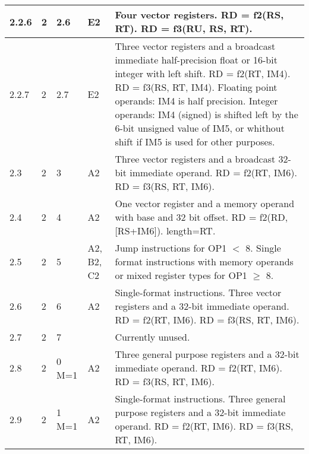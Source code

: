 \documentclass[forwardcom.tex]{subfiles}
\begin{document}
\begin{longtable} {|p{10mm}|p{6mm}|p{9mm}|p{7mm}|p{80mm}|}
\hline
2.2.6 & 2 & 2.6 & E2 & Four vector registers.\newline 
RD = f2(RS, RT). \newline 
RD = f3(RU, RS, RT).\\

\hline
2.2.7 & 2 & 2.7 & E2 & Three vector registers and a broadcast immediate half-precision float or 16-bit integer with left shift.\newline 
RD = f2(RT, IM4). \newline 
RD = f3(RS, RT, IM4).\newline
Floating point operands: IM4 is half precision.
Integer operands: IM4 (signed) is shifted left by the 6-bit unsigned value of IM5, or whithout shift if IM5 is used for other purposes. \\

\hline
2.3 & 2 & 3 & A2 & Three vector registers and a broadcast 32-bit immediate operand.\newline 
RD = f2(RT, IM6). \newline 
RD = f3(RS, RT, IM6).\\

\hline
2.4 & 2 & 4 & A2 & One vector register and a memory operand with base and 32 bit offset.\newline
RD = f2(RD, [RS+IM6]). length=RT.\\

\hline
2.5 & 2 & 5 & A2, B2, C2 & Jump instructions for OP1 $<$ 8. Single format instructions with memory operands or mixed register types for OP1 $\geq$ 8.\\

\hline
2.6 & 2 & 6 & A2 & Single-format instructions. Three vector registers and a 32-bit immediate operand.\newline 
RD = f2(RT, IM6). \newline 
RD = f3(RS, RT, IM6).\\

\hline
2.7 & 2 & 7 &  & Currently unused.\\

\hline
2.8 & 2 & 0 M=1 & A2 & Three general purpose registers and a 32-bit immediate operand.\newline 
RD = f2(RT, IM6). \newline 
RD = f3(RS, RT, IM6).\\

\hline
2.9 & 2 & 1 M=1 & A2 & Single-format instructions. Three general purpose registers and a 32-bit immediate operand.\newline 
RD = f2(RT, IM6). \newline 
RD = f3(RS, RT, IM6).\\



\end{longtable}
\end{document}
